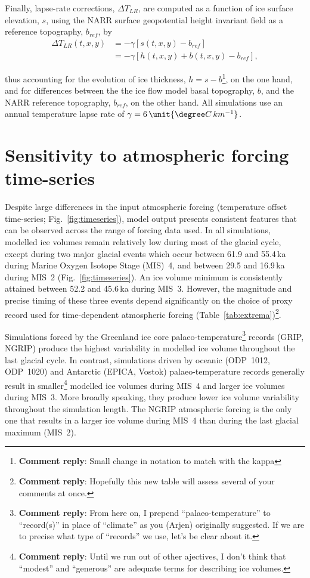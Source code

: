 \documentclass[tc, manuscript]{copernicus}
\newcommand{\renote}[1]{\footnote{\textbf{Comment reply}: #1}}
\begin{document}
Finally, lapse-rate corrections, ${\Delta}T_{LR}$, are computed as a function
of ice surface elevation, $s$, using the NARR surface geopotential height
invariant field as a reference topography, $b_{ref}$, by
\begin{align}
    {\Delta}T_{LR}(t, x, y) &= -\gamma [s(t, x, y)-b_{ref}] \\
                            &= -\gamma [h(t, x, y)+b(t, x, y)-b_{ref}],
\end{align}

thus accounting for the evolution of ice thickness, ${h=s-b}$\renote{
    Small change in notation to match with the kappa},
on the one hand, and
for differences between the the ice flow model basal topography, $b$, and the
NARR reference topography, $b_{ref}$, on the other hand. All simulations use an
annual temperature lapse rate of $\gamma = 6\,\unit{{\degree}C\,km^{-1}}$.

\section{Sensitivity to atmospheric forcing time-series}
\label{sec:results}

Despite large differences in the input atmospheric forcing (temperature offset
time-series; Fig.~\ref{fig:timeseries}), model output presents consistent
features that can be observed across the range of forcing data used. In all
simulations, modelled ice volumes remain relatively low during most of the
glacial cycle, except during two major glacial events which occur between 61.9
and 55.4\,ka during Marine Oxygen Isotope Stage (MIS)~4, and between 29.5 and
16.9\,ka during MIS~2 (Fig.~\ref{fig:timeseries}). An ice volume minimum is
consistently attained between 52.2 and 45.6\,ka during MIS~3. However, the
magnitude and precise timing of these three events depend significantly on the
choice of proxy record used for time-dependent atmospheric forcing
(Table~\ref{tab:extrema})\renote{
    Hopefully this new table will assess several of your comments at once.}.

Simulations forced by the Greenland ice core palaeo-temperature\renote{
    From here on, I prepend ``palaeo-temperature'' to ``record(s)'' in place of
    ``climate'' as you (Arjen) originally suggested. If we are to precise what
    type of ``records'' we use, let's be clear about it.}
records (GRIP, NGRIP) produce the highest variability in modelled ice volume
throughout the last glacial cycle. In contrast, simulations driven by oceanic
(ODP~1012, ODP~1020) and Antarctic (EPICA, Vostok) palaeo-temperature records
generally result in smaller\renote{
    Until we run out of other ajectives, I don't think that ``modest'' and
    ``generous'' are adequate terms for describing ice volumes.}
modelled ice volumes during MIS~4 and larger ice volumes during MIS~3.
More broadly speaking, they produce lower ice volume variability
throughout the simulation length. The NGRIP atmospheric forcing is the only one
that results in a larger ice volume during MIS~4 than during the last glacial
maximum (MIS~2).
\end{document}
